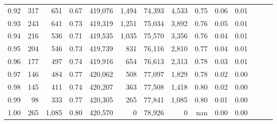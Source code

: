 \begin{tabular}{rrrrrrrrrrrrrr}
0.92 &    317 &    651 &  0.67 &  419,076 &    1,494 &  74,393 &   4,533 &  0.75 &  0.06 &      0.01 \\
0.93 &    243 &    641 &  0.73 &  419,319 &    1,251 &  75,034 &   3,892 &  0.76 &  0.05 &      0.01 \\
0.94 &    216 &    536 &  0.71 &  419,535 &    1,035 &  75,570 &   3,356 &  0.76 &  0.04 &      0.01 \\
0.95 &    204 &    546 &  0.73 &  419,739 &      831 &  76,116 &   2,810 &  0.77 &  0.04 &      0.01 \\
0.96 &    177 &    497 &  0.74 &  419,916 &      654 &  76,613 &   2,313 &  0.78 &  0.03 &      0.01 \\
0.97 &    146 &    484 &  0.77 &  420,062 &      508 &  77,097 &   1,829 &  0.78 &  0.02 &      0.00 \\
0.98 &    145 &    411 &  0.74 &  420,207 &      363 &  77,508 &   1,418 &  0.80 &  0.02 &      0.00 \\
0.99 &     98 &    333 &  0.77 &  420,305 &      265 &  77,841 &   1,085 &  0.80 &  0.01 &      0.00 \\
1.00 &    265 &  1,085 &  0.80 &  420,570 &        0 &  78,926 &       0 &   nan &  0.00 &      0.00 \\
\bottomrule
\end{tabular}
